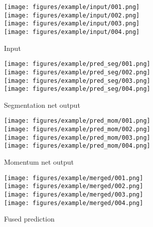 \begin{figure*}[t]
\begin{subfigure}{.2\linewidth}
  \centering
    \texttt{[image: figures/example/input/001.png]}\\
    \texttt{[image: figures/example/input/002.png]}\\
    \texttt{[image: figures/example/input/003.png]}\\
    \texttt{[image: figures/example/input/004.png]}
  \caption{\scriptsize Input}
  \label{fig:ex_fusion_input}
\end{subfigure}%
\begin{subfigure}{.2\linewidth}
  \centering
    \texttt{[image: figures/example/pred\_seg/001.png]}\\
    \texttt{[image: figures/example/pred\_seg/002.png]}\\
    \texttt{[image: figures/example/pred\_seg/003.png]}\\
    \texttt{[image: figures/example/pred\_seg/004.png]}
  \caption{\scriptsize Segmentation net output}
  \label{fig:ex_fusion_seg}
\end{subfigure}%
\begin{subfigure}{.2\linewidth}
  \centering
    \texttt{[image: figures/example/pred\_mom/001.png]}\\
    \texttt{[image: figures/example/pred\_mom/002.png]}\\
    \texttt{[image: figures/example/pred\_mom/003.png]}\\
    \texttt{[image: figures/example/pred\_mom/004.png]}
  \caption{\scriptsize Momentum net output}
  \label{fig:ex_fusion_mom}
\end{subfigure}%
\begin{subfigure}{.2\linewidth}
  \centering
    \texttt{[image: figures/example/merged/001.png]}\\
    \texttt{[image: figures/example/merged/002.png]}\\
    \texttt{[image: figures/example/merged/003.png]}\\
    \texttt{[image: figures/example/merged/004.png]}
  \caption{\scriptsize Fused prediction}
  \label{fig:ex_fusion_merged}
\end{subfigure}%

\end{figure*}
